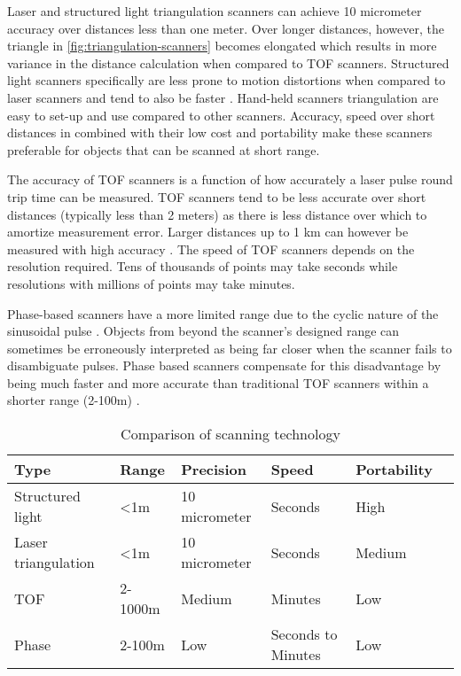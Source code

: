 Laser and structured light triangulation scanners can achieve 10 micrometer accuracy over distances less than one meter. Over longer distances, however, the triangle in \autoref{fig:triangulation-scanners} becomes elongated which results in more variance in the distance calculation \cite{Mackinnon2006} when compared to TOF scanners. Structured light scanners specifically are less prone to motion distortions when compared to laser scanners and tend to also be faster \cite{Brown2012}. Hand-held scanners triangulation are easy to set-up and use compared to other scanners. Accuracy, speed over short distances in combined with their low cost and portability make these scanners preferable for objects that can be scanned at short range.

The accuracy of TOF scanners is a function of how accurately a laser pulse round trip time can be measured. TOF scanners tend to be less accurate over short distances (typically less than 2 meters) as there is less distance over which to amortize measurement error. Larger distances up to 1 km can however be measured with high accuracy \cite{Form2014}. The speed of TOF scanners depends on the resolution required. Tens of thousands of points may take seconds while resolutions with millions of points may take minutes.

Phase-based scanners have a more limited range due to the cyclic nature of the sinusoidal pulse \cite{Bhurtha}. Objects from beyond the scanner's designed range can sometimes be erroneously interpreted as being far closer when the scanner fails to disambiguate pulses. Phase based scanners compensate for this disadvantage by being much faster and more accurate than traditional TOF scanners within a shorter range (2-100m) \cite{Form2014}.


\begin{table}
\begin{tabular}{ |l|l|l|l|l|l| }
  \hline
  Type &              Range &        Precision       & Speed & Portability \\
  \hline
  Structured light &    <1m     & 10 micrometer  & Seconds & High \\
  Laser triangulation & <1m     & 10 micrometer  & Seconds  & Medium \\     
  TOF &                 2-1000m & Medium      & Minutes & Low \\
  Phase &               2-100m & Low         & Seconds to Minutes & Low \\
  \hline  
\end{tabular}
\caption{Comparison of scanning technology}
\end{table}


